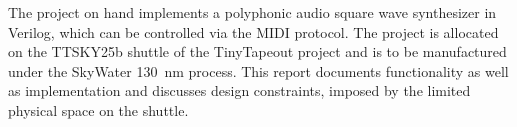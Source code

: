 \null\vspace{\fill}


The project on hand implements a polyphonic audio square wave synthesizer in Verilog, which can be controlled via the \ac{MIDI} protocol. The project is allocated on the TTSKY25b shuttle of the TinyTapeout project and is to be manufactured under the SkyWater \SI{130}{\nano\meter} process. This report documents functionality as well as implementation and discusses design constraints, imposed by the limited physical space on the shuttle.

\vspace{\fill}